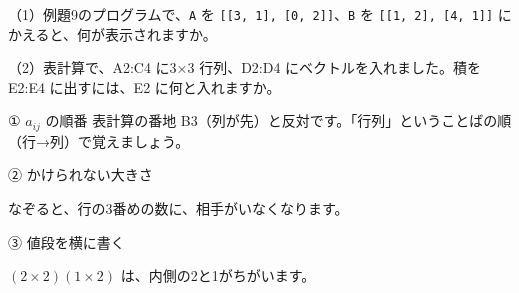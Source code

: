 \begin{jibun}
（1）例題9のプログラムで、\texttt{A} を \texttt{[[3, 1], [0, 2]]}、\texttt{B} を \texttt{[[1, 2], [4, 1]]} にかえると、何が表示されますか。\par
（2）表計算で、A2:C4 に3×3 行列、D2:D4 にベクトルを入れました。積を E2:E4 に出すには、E2 に何と入れますか。
\end{jibun}




\begin{tsumazuki}{① $a_{ij}$ の順番}
表計算の番地 B3（列が先）と反対です。「行列」ということばの順\mbox{（行→列）}で覚えましょう。
\end{tsumazuki}

\noindent\begin{minipage}[t]{0.485\linewidth}\vspace{0pt}
\begin{tsumazuki}{② かけられない大きさ}
\raggedright{}
なぞると、行の3番めの数に、相手がいなくなります。
\end{tsumazuki}
\end{minipage}\hfill
\begin{minipage}[t]{0.485\linewidth}\vspace{0pt}
\begin{tsumazuki}{③ 値段を横に書く}
\raggedright{}
$(2\times2)(1\times2)$ は、内側の2と1がちがいます。
\end{tsumazuki}
\end{minipage}

